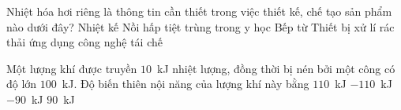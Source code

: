 	\begin{ex}%
		Nhiệt hóa hơi riêng là thông tin cần thiết trong việc thiết kế, chế tạo sản phẩm nào dưới đây?
		\choice
		{Nhiệt kế}
		{\True Nồi hấp tiệt trùng trong y học}
		{Bếp từ}
		{Thiết bị xử lí rác thải ứng dụng công nghệ tái chế}
	\end{ex}

	\begin{ex}%
		Một lượng khí được truyền $10$~kJ nhiệt lượng, đồng thời bị nén bởi một công có độ lớn $100$~kJ. Độ biến thiên nội năng của lượng khí này bằng
		\choice
		{\True $110$~kJ}
		{$-110$~kJ}
		{$-90$~kJ}
		{$90$~kJ}
	\end{ex}

